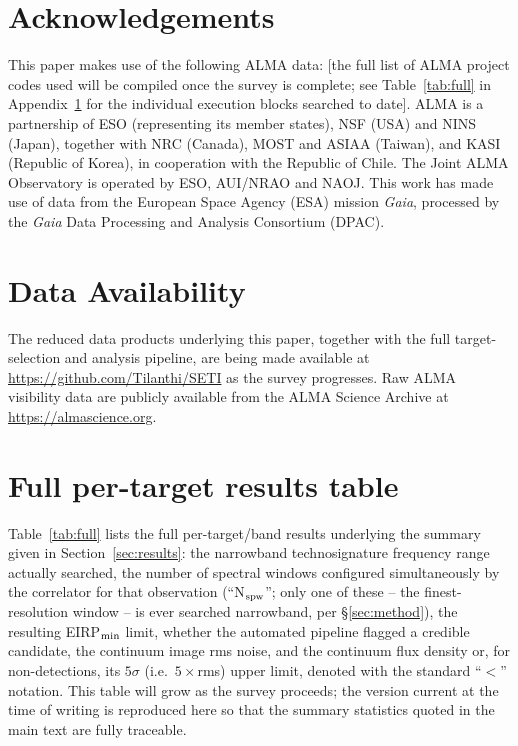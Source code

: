 \documentclass{openjournal}
\begin{document}
\section*{Acknowledgements}
This paper makes use of the following ALMA data: [the full list of ALMA
project codes used will be compiled once the survey is complete; see
Table~\ref{tab:full} in Appendix~\ref{app:table} for the individual
execution blocks searched to date]. ALMA is a partnership of ESO
(representing its member states), NSF (USA) and NINS (Japan), together with NRC
(Canada), MOST and ASIAA (Taiwan), and KASI (Republic of Korea), in cooperation
with the Republic of Chile. The Joint ALMA Observatory is operated by ESO,
AUI/NRAO and NAOJ. This work has made use of data from the European Space
Agency (ESA) mission {\it Gaia}, processed by the {\it Gaia} Data Processing and
Analysis Consortium (DPAC).

\section*{Data Availability}
The reduced data products underlying this paper, together with the full
target-selection and analysis pipeline, are being made available at
\url{https://github.com/Tilanthi/SETI} as the survey progresses. Raw ALMA
visibility data are publicly available from the ALMA Science Archive at
\url{https://almascience.org}.


\appendix
\section{Full per-target results table}
\label{app:table}

Table~\ref{tab:full} lists the full per-target/band results underlying the
summary given in Section~\ref{sec:results}: the narrowband technosignature
frequency range actually searched, the number of spectral windows
configured simultaneously by the correlator for that observation
(``N$_{\rm spw}$''; only one of these -- the finest-resolution window --
is ever searched narrowband, per \S\ref{sec:method}), the resulting
EIRP$_{\rm min}$ limit, whether the automated pipeline flagged a credible
candidate, the continuum image rms noise, and the continuum flux density
or, for non-detections, its $5\sigma$ (i.e.\ $5\times$rms) upper limit,
denoted with the standard ``$<$'' notation. This table will grow as the
survey proceeds; the version current at the time of writing is
reproduced here so that the summary statistics quoted in the main text
are fully traceable.
\end{document}
